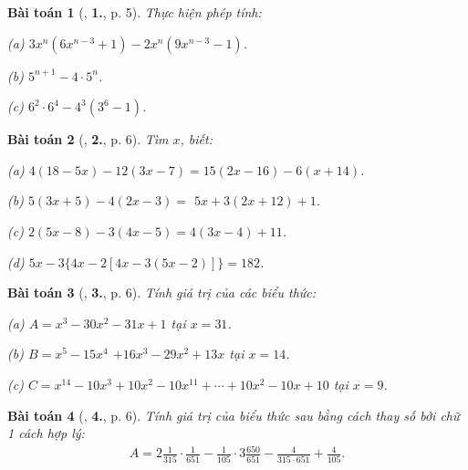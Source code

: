 \documentclass{article}
\numberwithin{equation}{section}
\newtheorem{baitoan}{Bài toán}[section]
\begin{document}
\begin{baitoan}[\cite{Binh_Toan_8_tap_1}, \textbf{1.}, p. 5]
	Thực hiện phép tính:
	\begin{enumerate*}
		\item[(a)] $3x^n(6x^{n-3} + 1) - 2x^n(9x^{n-3} - 1)$.
		\item[(b)] $5^{n+1} - 4\cdot 5^n$.
		\item[(c)] $6^2\cdot 6^4 - 4^3(3^6 - 1)$.
	\end{enumerate*}
\end{baitoan}

\begin{baitoan}[\cite{Binh_Toan_8_tap_1}, \textbf{2.}, p. 6]
	Tìm $x$, biết:
	\begin{enumerate*}
		\item[(a)] $4(18 - 5x) - 12(3x - 7) = 15(2x - 16) - 6(x + 14)$.
		\item[(b)] $5(3x + 5) - 4(2x - 3) =$ $5x + 3(2x + 12) + 1$.
		\item[(c)] $2(5x - 8) - 3(4x - 5) = 4(3x - 4) + 11$.
		\item[(d)] $5x - 3\{4x - 2[4x - 3(5x - 2)]\} = 182$.
	\end{enumerate*}
\end{baitoan}

\begin{baitoan}[\cite{Binh_Toan_8_tap_1}, \textbf{3.}, p. 6]
	Tính giá trị của các biểu thức:
	\begin{enumerate*}
		\item[(a)] $A = x^3 - 30x^2 - 31x + 1$ tại $x = 31$.
		\item[(b)] $B = x^5 - 15x^4$ $+ 16x^3 - 29x^2 + 13x$ tại $x = 14$.
		\item[(c)] $C = x^{14} - 10x^3 + 10x^2 - 10x^{11} + \cdots + 10x^2 - 10x + 10$ tại $x = 9$.
	\end{enumerate*}
\end{baitoan}

\begin{baitoan}[\cite{Binh_Toan_8_tap_1}, \textbf{4.}, p. 6]
	Tính giá trị của biểu thức sau bằng cách thay số bởi chữ 1 cách hợp lý:
	\begin{align*}
		A = 2\frac{1}{315}\cdot\frac{1}{651} - \frac{1}{105}\cdot 3\frac{650}{651} - \frac{4}{315\cdot 651} + \frac{4}{105}.
	\end{align*}
\end{baitoan}

\end{document}
